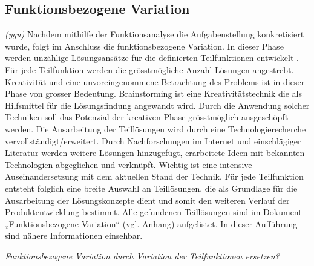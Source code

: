 \subsection{Funktionsbezogene Variation}
\label{funktionsbez_var}
\textit{(ygu)} Nachdem mithilfe der Funktionsanalyse die Aufgabenstellung konkretisiert wurde, folgt im Anschluss die funktionsbezogene Variation. In dieser Phase werden unzählige Lösungsansätze für die definierten Teilfunktionen entwickelt \cite{pahl}. Für jede Teilfunktion werden die grösstmögliche Anzahl Lösungen angestrebt.
\newline
Kreativität und eine unvoreingenommene Betrachtung des Problems ist in dieser Phase von grosser Bedeutung. Brainstorming ist eine Kreativitätstechnik die als Hilfsmittel für die Lösungsfindung angewandt wird. Durch die Anwendung solcher Techniken soll das Potenzial der kreativen Phase grösstmöglich ausgeschöpft werden.
\newline
Die Ausarbeitung der Teillösungen wird durch eine Technologierecherche vervollständigt/erweitert. Durch Nachforschungen im Internet und einschlägiger Literatur werden weitere Lösungen hinzugefügt, erarbeitete Ideen mit bekannten Technologien abgeglichen und verknüpft. Wichtig ist eine intensive Auseinandersetzung mit dem aktuellen Stand der Technik.
\newline
Für jede Teilfunktion entsteht folglich eine breite Auswahl an Teillösungen, die als Grundlage für die Ausarbeitung der Lösungskonzepte dient und somit den weiteren Verlauf der Produktentwicklung bestimmt. Alle gefundenen Teillösungen sind im Dokument „Funktionsbezogene Variation“ (vgl. Anhang) aufgelistet. In dieser Aufführung sind nähere Informationen einsehbar.

\textit{Funktionsbezogene Variation durch Variation der Teilfunktionen ersetzen?}
